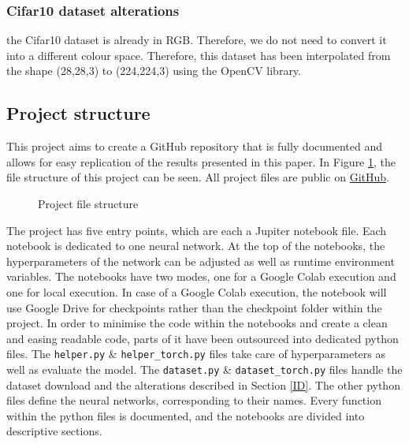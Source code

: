 \documentclass[conference]{IEEEtran}
\begin{document}
\subsubsection{Cifar10 dataset alterations}
the Cifar10 dataset is already in RGB. Therefore, we do not need to convert it into a different colour space. 
Therefore, this dataset has been interpolated from the shape (28,28,3) to (224,224,3) using the OpenCV library.

\subsection{Project structure}
This project aims to create a GitHub repository that is fully documented and allows for easy replication of the results presented in this paper. 
In Figure \ref{dir: file strucutre}, the file structure of this project can be seen.
All project files are public on \href{https://github.com/devasworski/Deeper-Networks-for-Image-Classification}{GitHub}.

\begin{figure}[!htbp]
\caption{Project file structure}
\label{dir: file strucutre}
\end{figure}

The project has five entry points, which are each a Jupiter notebook file. 
Each notebook is dedicated to one neural network.
At the top of the notebooks, the hyperparameters of the network can be adjusted as well as runtime environment variables.
The notebooks have two modes, one for a Google Colab execution and one for local execution.
In case of a Google Colab execution, the notebook will use Google Drive for checkpoints rather than the checkpoint folder within the project.
In order to minimise the code within the notebooks and create a clean and easing readable code, parts of it have been outsourced into dedicated python files.
The \verb|helper.py| \& \verb|helper_torch.py| files take care of hyperparameters as well as evaluate the model. 
The \verb|dataset.py| \& \verb|dataset_torch.py| files handle the dataset download and the alterations described in Section \ref{ID}.
The other python files define the neural networks, corresponding to their names. Every function within the python files is documented, and the notebooks are divided into descriptive sections.
\end{document}
